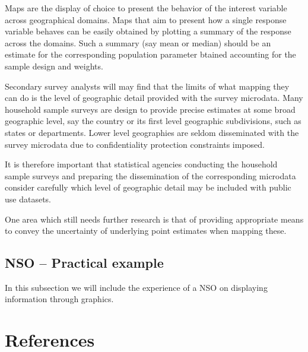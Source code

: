 \documentclass[
  12pt,
]{book}
\begin{document}
Maps are the display of choice to present the behavior of the interest variable across geographical domains. Maps that aim to present how a single response variable behaves can be easily obtained by plotting a summary of the response across the domains. Such a summary (say mean or median) should be an estimate for the corresponding population parameter btained accounting for the sample design and weights.

Secondary survey analysts will may find that the limits of what mapping they can do is the level of geographic detail provided with the survey microdata. Many household sample surveys are design to provide precise estimates at some broad geographic level, say the country or its first level geographic subdivisions, such as states or departments. Lower level geographies are seldom disseminated with the survey microdata due to confidentiality protection constraints imposed.

It is therefore important that statistical agencies conducting the household sample surveys and preparing the dissemination of the corresponding microdata consider carefully which level of geographic detail may be included with public use datasets.

One area which still needs further research is that of providing appropriate means to convey the uncertainty of underlying point estimates when mapping these.

\section{NSO -- Practical example}\label{nso-practical-example-3}

In this subsection we will include the experience of a NSO on displaying information through graphics.

\chapter*{References}\label{references}

  
\end{document}
